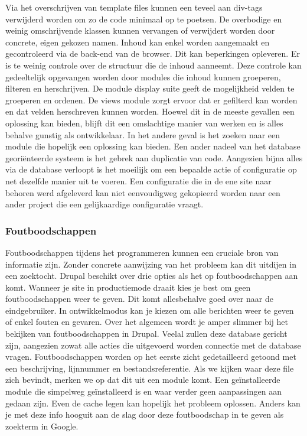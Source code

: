 \noindent
Via het overschrijven van template files kunnen een teveel aan div-tags verwijderd worden om zo de code minimaal op te poetsen. De overbodige en weinig omschrijvende klassen kunnen vervangen of verwijdert worden door concrete, eigen gekozen namen.
\newline\newline
Inhoud kan enkel worden aangemaakt en gecontroleerd via de back-end van de browser. Dit kan beperkingen opleveren. Er is te weinig controle over de structuur die de inhoud aanneemt. Deze controle kan gedeeltelijk opgevangen worden door modules die inhoud kunnen groeperen, filteren en herschrijven. De module display suite geeft de mogelijkheid velden te groeperen en ordenen. De views module zorgt ervoor dat er gefilterd kan worden en dat velden herschreven kunnen worden. Hoewel dit in de meeste gevallen een oplossing kan bieden, blijft dit een omslachtige manier van werken en is alles behalve gunstig als ontwikkelaar. In het andere geval is het zoeken naar een module die hopelijk een oplossing kan bieden.
\newline\newline
Een ander nadeel van het database georiënteerde systeem is het gebrek aan duplicatie van code. Aangezien bijna alles via de database verloopt is het moeilijk om een bepaalde actie of configuratie op net dezelfde manier uit te voeren. Een configuratie die in de ene site naar behoren werd afgeleverd kan niet eenvoudigweg gekopieerd worden naar een ander project die een gelijkaardige configuratie vraagt.

\subsubsection{Foutboodschappen}
Foutboodschappen tijdens het programmeren kunnen een cruciale bron van informatie zijn. Zonder concrete aanwijzing van het probleem kan dit uitdijen in een zoektocht. Drupal beschikt over drie opties als het op foutboodschappen aan komt. Wanneer je site in productiemode draait kies je best om geen foutboodschappen weer te geven. Dit komt allesbehalve goed over naar de eindgebruiker. In ontwikkelmodus kan je kiezen om alle berichten weer te geven of enkel fouten en gevaren. 
\newline\newline
Over het algemeen wordt je amper slimmer bij het bekijken van foutboodschappen in Drupal. Veelal zullen deze database gericht zijn, aangezien zowat alle acties die uitgevoerd worden connectie met de database vragen. Foutboodschappen worden op het eerste zicht gedetailleerd getoond met een beschrijving, lijnnummer en bestandsreferentie. Als we kijken waar deze file zich bevindt, merken we op dat dit uit een module komt. Een geïnstalleerde module die simpelweg geïnstalleerd is en waar verder geen aanpassingen aan gedaan zijn. Even de cache legen kan hopelijk het probleem oplossen. Anders kan je met deze info hooguit aan de slag door deze foutboodschap in te geven als zoekterm in Google.
 
